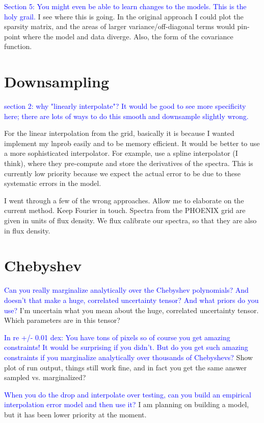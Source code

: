 \documentclass[preprint]{aastex} %
\newcommand{\hcom}[1]{ \textcolor{Blue}{#1}}
\begin{document}
\hcom{Section 5: You might even be able to learn changes to the models. This is the holy grail.}
I see where this is going. In the original approach I could plot the sparsity matrix, and the areas of larger variance/off-diagonal terms would pin-point where the model and data diverge. Also, the form of the covariance function.

\section{Downsampling}

\hcom{section 2: why "linearly interpolate"? It would be good to see more specificity here; there are lots of ways to do this smooth and downsample slightly wrong.}

For the linear interpolation from the grid, basically it is because I wanted implement my lnprob easily and to be memory efficient. It would be better to use a more sophisticated interpolator. For example, \citet{hwd+13} use a spline interpolator (I think), where they pre-compute and store the derivatives of the spectra. This is currently low priority because we expect the actual error to be due to these systematic errors in the model.

I went through a few of the wrong approaches. Allow me to elaborate on the current method.
Keep Fourier in touch. Spectra from the PHOENIX grid are given in units of flux density. We flux calibrate our spectra, so that they are also in flux density.

\section{Chebyshev}
\hcom{Can you really marginalize analytically over the Chebyshev polynomials? And doesn't that make a huge, correlated uncertainty tensor? And what priors do you use?}
I'm uncertain what you mean about the huge, correlated uncertainty tensor. Which parameters are in this tensor? 

\hcom{In re +/- 0.01 dex: You have tons of pixels so of course you get amazing constraints! It would be surprising if you didn't. But do you get such amazing constraints if you marginalize analytically over thousands of Chebyshevs?}
Show plot of run output, things still work fine, and in fact you get the same answer sampled vs. marginalized?

\hcom{When you do the drop and interpolate over testing, can you build an empirical interpolation error model and then use it?}
I am planning on building a model, but it has been lower priority at the moment. 








\end{document}
